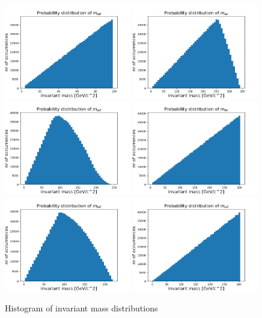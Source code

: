 \documentclass[12p,a4paper]{article}
\begin{document}
\begin{figure}[H]
    \centering
    \includegraphics[width=0.49\textwidth]{fig/m_ab.png}
    \includegraphics[width=0.49\textwidth]{fig/m_ac.png}
    \includegraphics[width=0.49\textwidth]{fig/m_ad.png}
    \includegraphics[width=0.49\textwidth]{fig/m_bc.png}
    \includegraphics[width=0.49\textwidth]{fig/m_bd.png}
    \includegraphics[width=0.49\textwidth]{fig/m_cd.png}
    \caption{Histogram of invariant mass distributions}
    \label{fig:seperate_m}
\end{figure}
\end{document}

